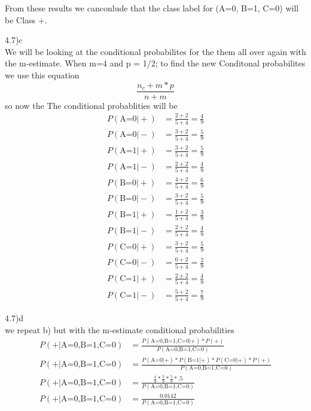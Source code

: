 \documentclass[12pt,english]{article}
\begin{document}
\par
From these results we canconlude that the class label for (A=0, B=1, C=0) will be Class +.\par
4.7)c\\
We will be looking at the conditional probabilites for the them all over again with the m-estimate. When m=4 and p = 1/2;
to find the new Conditonal probabilites we use this equation
\begin{equation}
\frac{ n_c + m * p}{n + m}
\end{equation}
so now the The conditional probablities will be
\begin{equation}
\begin{split}
P(\mbox{A=0} \vert +) &= \frac{2 + 2}{5 + 4} = \frac{4}{9}\\
P(\mbox{A=0} \vert -) &= \frac{3 + 2}{5 + 4} = \frac{5}{9}\\
P(\mbox{A=1} \vert +) &= \frac{3 + 2}{5 + 4} = \frac{5}{9}\\
P(\mbox{A=1} \vert -) &= \frac{2 + 2}{5 + 4} = \frac{4}{9}\\
P(\mbox{B=0} \vert +) &= \frac{4 + 2}{5 + 4} = \frac{6}{9}\\
P(\mbox{B=0} \vert -) &= \frac{3 + 2}{5 + 4} = \frac{5}{9}\\
P(\mbox{B=1} \vert +) &= \frac{1 + 2}{5 + 4} = \frac{3}{9}\\
P(\mbox{B=1} \vert -) &= \frac{2 + 2}{5 + 4} = \frac{4}{9}\\
P(\mbox{C=0} \vert +) &= \frac{3 + 2}{5 + 4} = \frac{5}{9}\\
P(\mbox{C=0} \vert -) &= \frac{0 + 2}{5 + 4} = \frac{2}{9}\\
P(\mbox{C=1} \vert +) &= \frac{2 + 2}{5 + 4} = \frac{4}{9}\\
P(\mbox{C=1} \vert -) &= \frac{5 + 2}{5 + 4} = \frac{7}{9}
\end{split}
\end{equation}
\par
4.7)d\\
we repeat b) but with the m-estimate conditional probabilities
\begin{equation}
\begin{split}
P(\mbox{+} \vert \mbox{A=0,B=1,C=0}) &= \frac{P(\mbox{A=0,B=1,C=0} \vert \mbox{+}) * P(\mbox{+})}{P(\mbox{A=0,B=1,C=0})}\\
P(\mbox{+} \vert \mbox{A=0,B=1,C=0}) &= \frac{P(\mbox{A=0} \vert \mbox{+}) * P(\mbox{B=1} \vert \mbox{+}) *P(\mbox{C=0} \vert \mbox{+}) * P(\mbox{+})}{P(\mbox{A=0,B=1,C=0})}\\
P(\mbox{+} \vert \mbox{A=0,B=1,C=0}) &= \frac{\frac{4}{9} * \frac{3}{9} *\frac{5}{9} * .5}{P(\mbox{A=0,B=1,C=0})}\\
P(\mbox{+} \vert \mbox{A=0,B=1,C=0}) &= \frac{0.0142}{P(\mbox{A=0,B=1,C=0})}\\
\end{split}
\end{equation}
\end{document}
